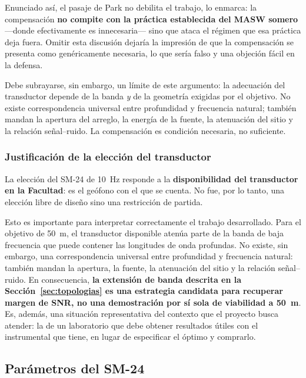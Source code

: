 Enunciado as\'i, el pasaje de Park no debilita el trabajo, lo enmarca: la compensaci\'on
\textbf{no compite con la pr\'actica establecida del MASW somero} ---donde efectivamente
es innecesaria--- sino que ataca el r\'egimen que esa pr\'actica deja fuera. Omitir esta
discusi\'on dejar\'ia la impresi\'on de que la compensaci\'on se presenta como
gen\'ericamente necesaria, lo que ser\'ia falso y una objeci\'on f\'acil en la defensa.

Debe subrayarse, sin embargo, un l\'imite de este argumento: la adecuaci\'on del
transductor depende de la banda \emph{y} de la geometr\'ia exigidas por el objetivo. No
existe correspondencia universal entre profundidad y frecuencia natural; tambi\'en mandan
la apertura del arreglo, la energ\'ia de la fuente, la atenuaci\'on del sitio y la
relaci\'on se\~nal--ruido. La compensaci\'on es condici\'on necesaria, no suficiente.

\subsubsection{Justificaci\'on de la elecci\'on del transductor}

La elecci\'on del SM-24 de \SI{10}{\hertz} responde a la \textbf{disponibilidad del
transductor en la Facultad}: es el ge\'ofono con el que se cuenta. No fue, por lo tanto,
una elecci\'on libre de dise\~no sino una restricci\'on de partida.

Esto es importante para interpretar correctamente el trabajo desarrollado. Para el
objetivo de \SI{50}{\meter}, el transductor disponible atenúa parte de la banda de baja
frecuencia que puede contener las longitudes de onda profundas. No existe, sin embargo,
una correspondencia universal entre profundidad y frecuencia natural: tambi\'en mandan la
apertura, la fuente, la atenuaci\'on del sitio y la relaci\'on se\~nal--ruido. En
consecuencia, \textbf{la extensi\'on de banda descrita en la
Secci\'on~\ref{sec:topologias} es una estrategia candidata para recuperar margen de SNR,
no una demostraci\'on por s\'i sola de viabilidad a \SI{50}{\meter}}. Es, adem\'as, una
situaci\'on representativa del contexto que el proyecto busca atender: la de un
laboratorio que debe obtener resultados \'utiles con el instrumental que tiene, en lugar
de especificar el \'optimo y comprarlo.

\subsection{Par\'ametros del SM-24}

